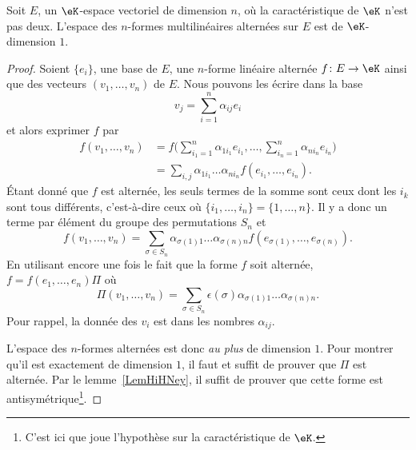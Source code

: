 \begin{proposition} \label{ProprbjihK}
	Soit \( E\), un \( \eK\)-espace vectoriel de dimension \( n\), où la caractéristique de \( \eK\) n'est pas deux. L'espace des \( n\)-formes multilinéaires alternées sur \( E\) est de \( \eK\)-dimension \( 1\).
\end{proposition}

\begin{proof}
	Soient \( \{ e_i \}\), une base de \( E\), une \( n\)-forme linéaire alternée \( f\colon E\to \eK\) ainsi que des vecteurs \( (v_1,\ldots, v_n)\) de \( E\). Nous pouvons les écrire dans la base
	\begin{equation}
		v_j=\sum_{i=1}^n\alpha_{ij}e_i
	\end{equation}
	et alors exprimer \( f\) par
	\begin{subequations}
		\begin{align}
			f(v_1,\ldots, v_n) & =f\big( \sum_{i_1=1}^n\alpha_{1i_1}e_{i_1},\ldots, \sum_{i_n=1}^n\alpha_{ni_n}e_{i_n} \big) \\
			                   & =\sum_{i,j}\alpha_{1i_1}\ldots \alpha_{ni_n}f(e_{i_1},\ldots, e_{i_n}).
		\end{align}
	\end{subequations}
	Étant donné que \( f\) est alternée, les seuls termes de la somme sont ceux dont les \( i_k\) sont tous différents, c'est-à-dire ceux où \( \{ i_1,\ldots, i_n \}=\{ 1,\ldots, n \}\). Il y a donc un terme par élément du groupe des permutations \( S_n\) et
	\begin{equation}
		f(v_1,\ldots, v_n)=\sum_{\sigma\in S_n}\alpha_{\sigma(1)1}\ldots \alpha_{\sigma(n)n}f(e_{\sigma(1)},\ldots, e_{\sigma(n)}).
	\end{equation}
	En utilisant encore une fois le fait que la forme \( f\) soit alternée, \( f=f(e_1,\ldots, e_n)\Pi\) où
	\begin{equation}
		\Pi(v_1,\ldots, v_n)=\sum_{\sigma\in S_n}\epsilon(\sigma)\alpha_{\sigma(1)1}\ldots \alpha_{\sigma(n)n}.
	\end{equation}
	Pour rappel, la donnée des \( v_i\) est dans les nombres \( \alpha_{ij}\).

	L'espace des \( n\)-formes alternées est donc \emph{au plus} de dimension \( 1\). Pour montrer qu'il est exactement de dimension \( 1\), il faut et suffit de prouver que \( \Pi\) est alternée. Par le lemme~\ref{LemHiHNey}, il suffit de prouver que cette forme est antisymétrique\footnote{C'est ici que joue l'hypothèse sur la caractéristique de \( \eK\).}.


\end{proof}

